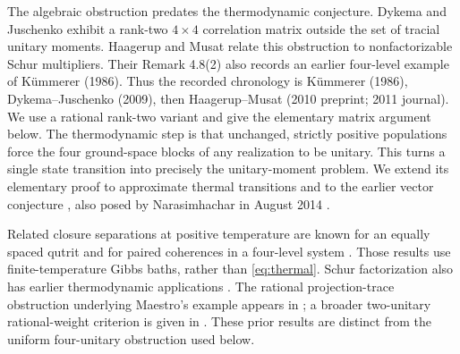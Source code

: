 \documentclass[11pt]{article}
\begin{document}
The algebraic obstruction predates the thermodynamic conjecture.
Dykema and Juschenko \cite[Proposition 2.10 and Corollary 2.11]{DJ}
exhibit a rank-two $4\times4$ correlation matrix outside the set of
tracial unitary moments. Haagerup and Musat
\cite[Lemma 2.8, Example 3.2 and Remark 3.6]{HM} relate this obstruction to
nonfactorizable Schur multipliers. Their Remark 4.8(2) also records an
earlier four-level example of K\"ummerer (1986). Thus the recorded
chronology is K\"ummerer (1986), Dykema--Juschenko (2009), then
Haagerup--Musat (2010 preprint; 2011 journal).
We use a rational rank-two variant and
give the elementary matrix argument below. The thermodynamic step is that
unchanged, strictly positive populations force the four ground-space
blocks of any realization to be unitary. This turns a single state transition
into precisely the unitary-moment problem. We extend its elementary proof
to approximate thermal transitions and to the earlier vector conjecture
\cite[Supplementary Sec.\ II F, Conjecture 2, p.\ S11]{NG1,NG2}, also posed
by Narasimhachar in August 2014 \cite{MSE}.

Related closure separations at positive temperature are known for an equally
spaced qutrit \cite[Sec.\ IV C, Eq.\ (36)]{DHD} and for paired coherences in
a four-level system \cite[Sec.\ III B, Eqs.\ (20)--(28)]{CS}.
Those results use finite-temperature Gibbs baths, rather than
\eqref{eq:thermal}. Schur factorization also has earlier thermodynamic
applications \cite[Appendix C.2]{LSBNW}. The rational projection-trace
obstruction underlying Maestro's example appears in \cite[Proposition 3.2
and Example 3.4]{MR}; a broader two-unitary rational-weight criterion is
given in \cite[Proposition 3.6]{MUS}. These prior results are distinct from
the uniform four-unitary obstruction used below.
\end{document}
